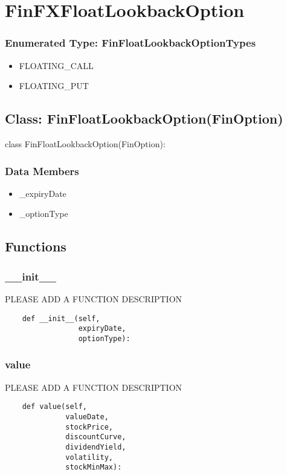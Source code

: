 \documentclass[twoside,11pt]{book}
\begin{document}
\newpage
\section{FinFXFloatLookbackOption}

\subsubsection{Enumerated Type: FinFloatLookbackOptionTypes}
\begin{itemize}
\item{FLOATING\_CALL}
\item{FLOATING\_PUT}
\end{itemize}

\subsection*{Class: FinFloatLookbackOption(FinOption)}
class FinFloatLookbackOption(FinOption): 

\subsubsection*{Data Members}
\begin{itemize}
\item{\_expiryDate}
\item{\_optionType}
\end{itemize}

\subsection*{Functions}

\subsubsection*{{\bf \_\_init\_\_}}
PLEASE ADD A FUNCTION DESCRIPTION

\begin{lstlisting}
    def __init__(self,
                 expiryDate,
                 optionType):
\end{lstlisting}

\subsubsection*{{\bf value}}
PLEASE ADD A FUNCTION DESCRIPTION

\begin{lstlisting}
    def value(self,
              valueDate,
              stockPrice,
              discountCurve,
              dividendYield,
              volatility,
              stockMinMax):
\end{lstlisting}
\end{document}
